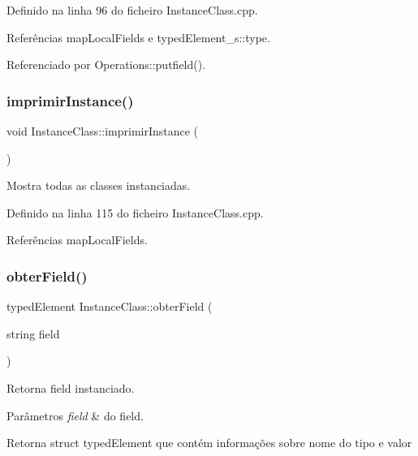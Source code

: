 Definido na linha 96 do ficheiro Instance\+Class.\+cpp.



Referências map\+Local\+Fields e typed\+Element\+\_\+s\+::type.



Referenciado por Operations\+::putfield().

\mbox{\label{classInstanceClass_a9790b6bb982d58a0bbddcb8c9ba358d4}} 
\subsubsection{\texorpdfstring{imprimir\+Instance()}{imprimirInstance()}}
{\footnotesize\ttfamily void Instance\+Class\+::imprimir\+Instance (\begin{DoxyParamCaption}{ }\end{DoxyParamCaption})}



Mostra todas as classes instanciadas. 



Definido na linha 115 do ficheiro Instance\+Class.\+cpp.



Referências map\+Local\+Fields.

\mbox{\label{classInstanceClass_a98084eb37c43d680169298bc50f09c98}} 
\subsubsection{\texorpdfstring{obter\+Field()}{obterField()}}
{\footnotesize\ttfamily typed\+Element Instance\+Class\+::obter\+Field (\begin{DoxyParamCaption}\item[{string}]{field }\end{DoxyParamCaption})}



Retorna field instanciado. 


\begin{DoxyParams}{Parâmetros}
{\em field} & do field. \\
\hline
\end{DoxyParams}
\begin{DoxyReturn}{Retorna}
struct typed\+Element que contém informações sobre nome do tipo e valor 
\end{DoxyReturn}


